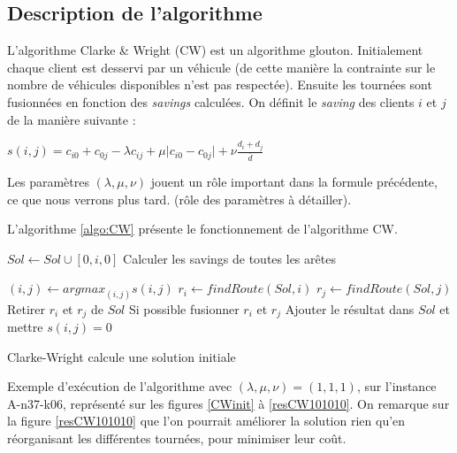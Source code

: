 \documentclass[a4paper,11pt]{article}%
\begin{document}
\subsection{Description de l'algorithme}
L'algorithme Clarke \& Wright (CW) est un algorithme glouton. 
Initialement chaque client est desservi par un véhicule (de cette manière la contrainte sur le nombre de véhicules disponibles n'est pas respectée). Ensuite les tournées sont fusionnées en fonction des \emph{savings} calculées.
On définit le \emph{saving} des clients $i$ et $j$ de la manière suivante :

\begin{center}
$s(i,j) = c_{i0} + c_{0j} - \lambda c_{ij} + \mu \vert c_{i0} - c_{0j} \vert + \nu \frac{d_i + d_j}{\overline{d}}$
\end{center}

Les paramètres $(\lambda, \mu, \nu)$ jouent un rôle important dans la formule précédente, ce que nous verrons plus tard. (rôle des paramètres à détailler). 

L'algorithme \ref{algo:CW} présente le fonctionnement de l'algorithme CW.

\begin{algorithm}
\DontPrintSemicolon %

 {
	$Sol \gets Sol \cup [0,i,0]$\;
}
Calculer les savings de toutes les arêtes\;

 {
	$(i,j) \gets argmax_{(i,j)} s(i,j)$\;
	$r_i \gets findRoute(Sol,i)$\;
	$r_j \gets findRoute(Sol,j)$\;
	 {
		Retirer $r_i$ et $r_j$ de $Sol$\;
		Si possible fusionner $r_i$ et $r_j$\;
		Ajouter le résultat dans $Sol$ et mettre $s(i,j) = 0$\;
	}
}

\;
\caption{{\sc Clarke-Wright} calcule une solution initiale}
\label{algo:CW}
\end{algorithm}

Exemple d'exécution de l'algorithme avec $(\lambda, \mu, \nu) = (1,1,1)$, sur l'instance A-n37-k06, représenté sur les figures \ref{CWinit} à \ref{resCW101010}. On remarque sur la figure \ref{resCW101010} que l'on pourrait améliorer la solution rien qu'en réorganisant les différentes tournées, pour minimiser leur coût.
\end{document}
